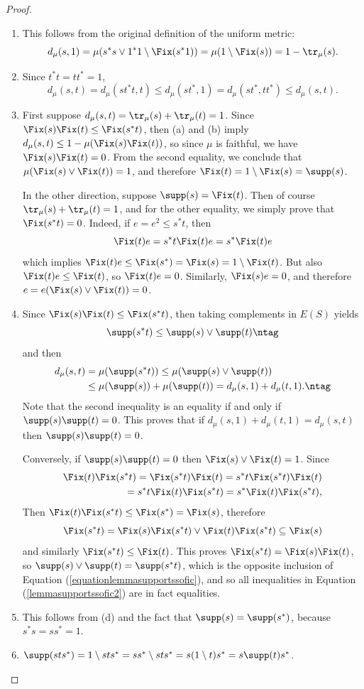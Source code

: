 \begin{proof}
\begin{enumerate}
\item[(a)] This follows from the original definition of the uniform metric:
\[d_\mu(s,1)=\mu(s^*s\lor 1^*1\setminus\Fix(s^*1))=\mu(1\setminus\Fix(s))=1-\tr_\mu(s).\]
\item[(b)] Since $t^*t=tt^*=1$,
\[d_\mu(s,t)=d_\mu(st^*t,t)\leq d_\mu(st^*,1)=d_\mu(st^*,tt^*)\leq d_\mu(s,t).\]
\item[(c)] First suppose $d_\mu(s,t)=\tr_\mu(s)+\tr_\mu(t)=1$. Since $\Fix(s)\Fix(t)\leq\Fix(s^*t)$, then (a) and (b) imply $d_\mu(s,t)\leq 1-\mu(\Fix(s)\Fix(t))$, so since $\mu$ is faithful, we have $\Fix(s)\Fix(t)=0$. From the second equality, we conclude that $\mu(\Fix(s)\lor\Fix(t))=1$, and therefore $\Fix(t)=1\setminus\Fix(s)=\supp(s)$.

In the other direction, suppose $\supp(s)=\Fix(t)$. Then of course $\tr_\mu(s)+\tr_\mu(t)=1$, and for the other equality, we simply prove that $\Fix(s^*t)=0$. Indeed, if $e=e^2\leq s^*t$, then
\[\Fix(t)e=s^*t\Fix(t)e=s^*\Fix(t)e\]
which implies $\Fix(t)e\leq\Fix(s^*)=\Fix(s)=1\setminus\Fix(t)$. But also $\Fix(t)e\leq\Fix(t)$, so $\Fix(t)e=0$. Similarly, $\Fix(s)e=0$, and therefore $e=e(\Fix(s)\lor\Fix(t))=0$.
\item[(d)] Since $\Fix(s)\Fix(t)\leq\Fix(s^*t)$, then taking complements in $E(S)$ yields
\[\supp(s^*t)\leq\supp(s)\lor\supp(t)\ntag\label{equationlemmasupportssofic}\]
and then
\begin{align*}
d_\mu(s,t)&=\mu(\supp(s^*t))\leq\mu(\supp(s)\lor\supp(t))\\
&\leq \mu(\supp(s))+\mu(\supp(t))=d_\mu(s,1)+d_\mu(t,1).\ntag\label{lemmasupportssofic2}
\end{align*}
Note that the second inequality is an equality if and only if $\supp(s)\supp(t)=0$. This proves that if $d_\mu(s,1)+d_\mu(t,1)=d_\mu(s,t)$ then $\supp(s)\supp(t)=0$.

Conversely, if $\supp(s)\supp(t)=0$ then $\Fix(s)\lor\Fix(t)=1$. Since
\begin{align*}
\Fix(t)\Fix(s^*t)=\Fix(s^*t)\Fix(t)=s^*t\Fix(s^*t)\Fix(t)\\
=s^*t\Fix(t)\Fix(s^*t)=s^*\Fix(t)\Fix(s^*t),
\end{align*}
Then $\Fix(t)\Fix(s^*t)\leq\Fix(s^*)=\Fix(s)$, therefore
\[\Fix(s^*t)=\Fix(s)\Fix(s^*t)\lor\Fix(t)\Fix(s^*t)\subseteq\Fix(s)\]
and similarly $\Fix(s^*t)\leq\Fix(t)$. This proves $\Fix(s^*t)=\Fix(s)\Fix(t)$, so $\supp(s)\lor\supp(t)=\supp(s^*t)$, which is the opposite inclusion of Equation (\ref{equationlemmasupportssofic}), and so all inequalities in Equation (\ref{lemmasupportssofic2}) are in fact equalities.
\item[(e)] This follows from (d) and the fact that $\supp(s)=\supp(s^*)$, because $s^*s=ss^*=1$.
\item[(f)] $\supp(sts^*)=1\setminus sts^*=ss^*\setminus sts^*=s(1\setminus t)s^*=s\supp(t)s^*$.\qedhere
\end{enumerate}
\end{proof}

